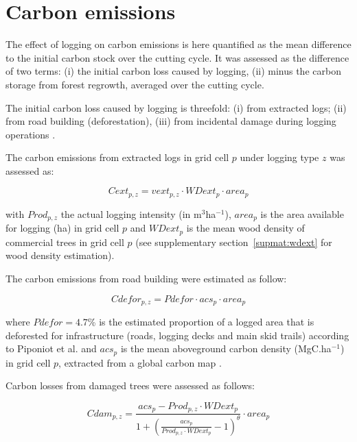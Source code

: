 \documentclass[12pt]{article}
\begin{document}
\section{Carbon emissions}
\label{sec:cemi}

The effect of logging on carbon emissions is here quantified as the mean difference to the initial carbon stock over the cutting cycle. It was assessed as the difference of two terms: (i) the initial carbon loss caused by logging, (ii) minus the carbon storage from forest regrowth, averaged over the cutting cycle. 

The initial carbon loss caused by logging is threefold: (i) from extracted logs; (ii) from road building (deforestation), (iii) from incidental damage during logging operations \cite{Piponiot2016}. 

The carbon emissions from extracted logs in grid cell $p$ under logging type $z$ was assessed as: 

\begin{equation}
\label{eq:cext}
    Cext_{p,z} = vext_{p,z} \cdot WDext_p \cdot  area_p
\end{equation}

with $Prod_{p,z}$ the actual logging intensity (in m$^3$ha$^{-1}$), $area_p$ is the area available for logging (ha) in grid cell $p$ and $WDext_p$ is the mean wood density of commercial trees in grid cell $p$ (see supplementary section~\ref{supmat:wdext} for wood density estimation). 

The carbon emissions from road building were estimated as follow: 

\begin{equation}
\label{eq:croad}
    Cdefor_{p,z} = Pdefor \cdot acs_p \cdot area_p
\end{equation}

where $Pdefor = 4.7 $\% is the estimated proportion of a logged area that is deforested for infrastructure (roads, logging decks and main skid trails) according to Piponiot et al. \cite{Piponiot2016} and $acs_p$ is the mean aboveground carbon density (MgC.ha$^{-1}$) in grid cell $p$, extracted from a global carbon map \cite{Avitabile2016}. 

Carbon losses from damaged trees were assessed as follows: 

\begin{equation}
\label{eq:cdam}
    Cdam_{p,z} = \frac{acs_p  - Prod_{p,z} \cdot WDext_p } {1 + \left(\frac{acs_p}{Prod_{p,z} \cdot WDext_p}  -1 \right)^\theta} \cdot area_p
\end{equation}
\end{document}
